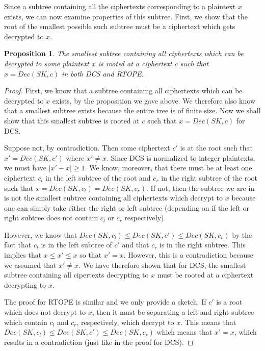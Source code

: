 \documentclass[12pt]{article}
\newtheorem{proposition}[theorem]{Proposition}
\begin{document}
Since a subtree containing all the ciphertexts corresponding to a plaintext $x$ exists, we can now examine properties of this subtree. First, we show that the root of the smallest possible such subtree must be a ciphertext which gets decrypted to $x$.

\begin{proposition}
  The smallest subtree containing all ciphertexts which can be decrypted to some plaintext $x$ is rooted at a ciphertext $c$ such that $x = Dec(SK, c)$ in both DCS and RTOPE.
\end{proposition}
\begin{proof}
  First, we know that a subtree containing all ciphertexts which can be decrypted to $x$ exists, by the proposition we gave above. We therefore also know that a smallest subtree exists because the entire tree is of finite size. Now we shall show that this smallest subtree is rooted at $c$ such that $x = Dec(SK, c)$ for DCS.

  Suppose not, by contradiction. Then some ciphertext $c'$ is at the root such that $x' = Dec(SK, c')$ where $x' \neq x$. Since DCS is normalized to integer plaintexts, we must have $|x' - x| \geq 1$. We know, moreover, that there must be at least one ciphertext $c_l$ in the left subtree of the root and $c_r$ in the right subtree of the root such that $x = Dec(SK, c_l) = Dec(SK, c_r)$. If not, then the subtree we are in is not the smallest subtree containing all ciphertexts which decrypt to $x$ because one can simply take either the right or left subtree (depending on if the left or right subtree does not contain $c_l$ or $c_r$ respectively).

  However, we know that $Dec(SK, c_l) \leq Dec(SK, c') \leq Dec(SK, c_r)$ by the fact that $c_l$ is in the left subtree of $c'$ and that $c_r$ is in the right subtree. This implies that $x \leq x' \leq x$ so that $x' = x$. However, this is a contradiction because we assumed that $x' \neq x$. We have therefore shown that for DCS, the smallest subtree containing all cipertexts decrypting to $x$ must be rooted at a ciphertext decrypting to $x$.

  The proof for RTOPE is similar and we only provide a sketch. If $c'$ is a root which does not decrypt to $x$, then it must be separating a left and right subtree which contain $c_l$ and $c_r$, respectively, which decrypt to $x$. This means that $Dec(SK, c_l) \leq Dec(SK, c') \leq Dec(SK, c_r)$ which means that $x' = x$, which results in a contradiction (just like in the proof for DCS).
\end{proof}
\end{document}
